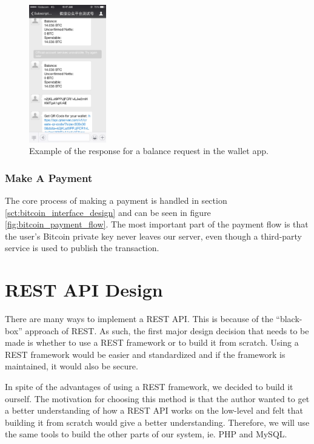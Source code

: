 \begin{figure}
  \centering
    \caption{Example of the response for a balance request in the wallet app.} 
    \includegraphics[width=0.3\textwidth]{figs/wechat_balance.jpg}
   
   \label{fig:wechat_balance}
\end{figure}

\subsubsection{Make A Payment}

The core process of making a payment is handled in section \ref{sct:bitcoin_interface_design} and can be seen in figure \ref{fig:bitcoin_payment_flow}. The most important part of the payment flow is that the user's Bitcoin private key never leaves our server, even though a third-party service is used to publish the transaction. 


\section{REST API Design}

There are many ways to implement a REST API. This is because of the ``black-box'' approach of REST. As such, the first major design decision that needs to be made is whether to use a REST framework or to build it from scratch. Using a REST framework would be easier and standardized and if the framework is maintained, it would also be secure.

In spite of the advantages of using a REST framework, we decided to build it ourself. The motivation for choosing this method is that the author wanted to get a better understanding of how a REST API works on the low-level and felt that building it from scratch would give a better understanding. Therefore, we will use the same tools to build the other parts of our system, ie. PHP and MySQL.

